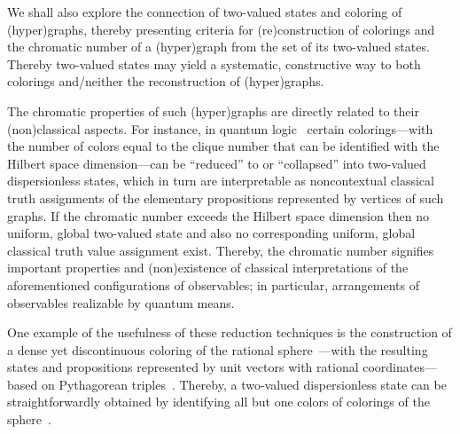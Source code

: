 \documentclass[%
12pt,
prereprint,
showpacs,
showkeys,
preprintnumbers,
amsmath,amssymb,
aps,
pra,
longbibliography,
notitlepage
]{revtex4-1}
\theoremstyle{definition}
\begin{document}
	We shall also explore the connection of two-valued states and coloring of (hyper)graphs, thereby presenting criteria for (re)construction of colorings and the chromatic number of a (hyper)graph from the set of its two-valued states. Thereby two-valued states may yield a systematic, constructive way to both colorings and/neither the reconstruction of (hyper)graphs.
	
	
	The chromatic properties of such (hyper)graphs are directly related to their (non)classical aspects.
	For instance, in quantum logic~\cite{birkhoff-36}
	certain colorings---with the number of colors equal to the clique number that can be identified with the Hilbert space dimension---can be ``reduced'' to or ``collapsed'' into two-valued dispersionless states, which in turn are interpretable as noncontextual classical truth assignments of the elementary propositions represented by vertices of such graphs. If the chromatic number exceeds  the Hilbert space dimension then no uniform, global two-valued state and also no corresponding uniform, global classical truth value assignment exist.
	Thereby, the chromatic number signifies important properties and (non)existence of classical interpretations of the aforementioned
	configurations of observables; in particular, arrangements of observables realizable by quantum means.
	
	One example of the usefulness of these reduction techniques is the construction of a dense yet discontinuous coloring
	of the rational sphere~\cite{meyer:99}---with the resulting states and propositions
	represented by unit vectors with rational coordinates---based on Pythagorean triples~\cite{havlicek-2000}.
	Thereby, a two-valued dispersionless state can be straightforwardly obtained by identifying all but one colors
	of colorings of the sphere~\cite{godsil-zaks}.
	
\end{document}
